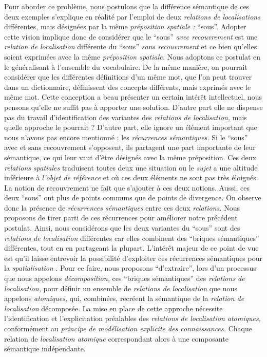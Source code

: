 Pour aborder ce problème, nous postulons que la différence sémantique
de ces deux exemples s'explique en réalité par l’emploi de deux
\emph{relations de localisations} différentes, mais désignées par la
même \emph{préposition spatiale :} \enquote{sous}. Adopter cette
vision implique donc de considérer que le \enquote{sous} \emph{avec
  recouvrement} est une \emph{relation de localisation} différente du
\enquote{sous} \emph{sans recouvrement} et ce bien qu'elles soient
exprimées avec la même \emph{préposition spatiale.} Nous adoptons ce
postulat en le généralisant à l'ensemble du vocabulaire. De la même
manière, on pourrait considérer que les différentes définitions d'un
même mot, que l'on peut trouver dans un dictionnaire, définissent des
concepts différents, mais exprimés avec le même mot. Cette conception
a beau présenter un certain intérêt intellectuel, nous pensons qu'elle
ne suffit pas à apporter une solution. D'autre part elle ne dispense
pas du travail d’identification des variantes des \emph{relations de
  localisation,} mais quelle approche le pourrait ?  D'autre part,
elle ignore un élément important que nous n'avons pas encore mentionné
: les \emph{récurrences sémantiques.} Si le \enquote{sous} avec et
sans recouvrement s'opposent, ils partagent une part importante de
leur sémantique, ce qui leur vaut d'être désignés avec la même
préposition. Ces deux \emph{relations spatiales} traduisent toutes
deux une situation ou le \emph{sujet} a une altitude inférieure à
\emph{l'objet de référence} et où ces deux éléments ne sont pas très
éloignés. La notion de recouvrement ne fait que s'ajouter à ces deux
notions. Aussi, ces deux \enquote{sous} ont plus de points communs que
de points de divergence. On observe donc la présence de
\emph{récurrences sémantiques} entre ces deux \emph{relations.} Nous
proposons de tirer parti de ces récurrences pour améliorer notre
précédent postulat. Ainsi, nous considérons que les deux variantes du
\enquote{sous} sont des \emph{relations de localisation} différentes
car elles combinent des \enquote{briques sémantiques} différentes,
tout en en partageant la plupart. L’intérêt majeur de ce point de vue
est qu'il laisse entrevoir la possibilité d'exploiter ces récurrences
sémantiques pour la \emph{spatialisation} \autocite{Bunel2019a}. Pour
ce faire, nous proposons \enquote{d'extraire}, lors d'un processus que
nous appelons \emph{décomposition,} ces \enquote{briques sémantiques}
des \emph{relations de localisation,} pour définir un ensemble de
\emph{relations de localisation} que nous appelons \emph{atomiques,}
qui, combinées, recréent la sémantique de la \emph{relation de
  localisation} décomposée. La mise en place de cette approche
nécessite l'identification et l'explicitation préalables des
\emph{relations de localisation atomiques,} conformément au
\emph{principe de modélisation explicite des connaissances.} Chaque
relation de \emph{localisation atomique} correspondant alors à une
composante sémantique indépendante.


